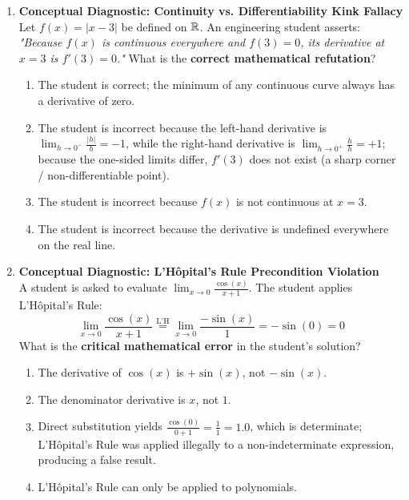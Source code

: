\begin{enumerate}[resume]
\item \textbf{Conceptual Diagnostic: Continuity vs. Differentiability Kink Fallacy} \\
Let $f(x) = |x - 3|$ be defined on $\mathbb{R}$. An engineering student asserts: \textit{"Because $f(x)$ is continuous everywhere and $f(3) = 0$, its derivative at $x = 3$ is $f'(3) = 0$."} What is the \textbf{correct mathematical refutation}?
\begin{enumerate}
    \item The student is correct; the minimum of any continuous curve always has a derivative of zero.
    \item The student is incorrect because the left-hand derivative is $\lim_{h \to 0^-} \frac{|h|}{h} = -1$, while the right-hand derivative is $\lim_{h \to 0^+} \frac{h}{h} = +1$; because the one-sided limits differ, $f'(3)$ does not exist (a sharp corner / non-differentiable point).
    \item The student is incorrect because $f(x)$ is not continuous at $x = 3$.
    \item The student is incorrect because the derivative is undefined everywhere on the real line.
\end{enumerate}

\item \textbf{Conceptual Diagnostic: L'Hôpital's Rule Precondition Violation} \\
A student is asked to evaluate $\lim_{x \to 0} \frac{\cos(x)}{x + 1}$. The student applies L'Hôpital's Rule:
$$\lim_{x \to 0} \frac{\cos(x)}{x + 1} \stackrel{\text{L'H}}{=} \lim_{x \to 0} \frac{-\sin(x)}{1} = -\sin(0) = 0$$
What is the \textbf{critical mathematical error} in the student's solution?
\begin{enumerate}
    \item The derivative of $\cos(x)$ is $+\sin(x)$, not $-\sin(x)$.
    \item The denominator derivative is $x$, not $1$.
    \item Direct substitution yields $\frac{\cos(0)}{0 + 1} = \frac{1}{1} = 1.0$, which is determinate; L'Hôpital's Rule was applied illegally to a non-indeterminate expression, producing a false result.
    \item L'Hôpital's Rule can only be applied to polynomials.
\end{enumerate}
\end{enumerate}